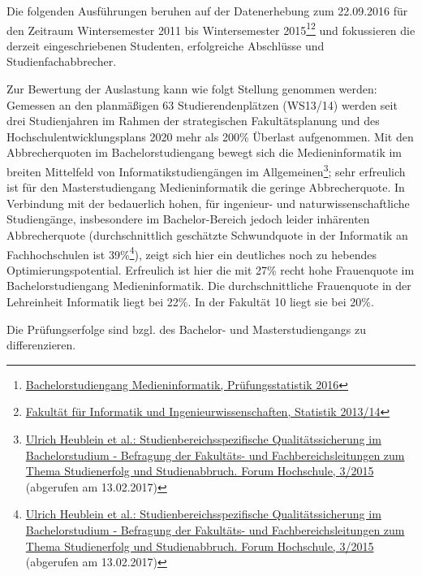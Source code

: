 Die folgenden Ausführungen beruhen auf der Datenerhebung zum 22.09.2016
für den Zeitraum Wintersemester 2011 bis Wintersemester 2015\footnote{\href{../anhaenge/pruefungsstatistiken.pdf}{Bachelorstudiengang
  Medieninformatik, Prüfungsstatistik 2016}}\footnote{\href{../anhaenge/Fakultaetsstruktur-Studienangebot-Personal-Haushaltsmittel-Kennzahlen-2014.pdf}{Fakultät
  für Informatik und Ingenieurwissenschaften, Statistik 2013/14}} und
fokussieren die derzeit eingeschriebenen Studenten, erfolgreiche
Abschlüsse und Studienfachabbrecher.

Zur Bewertung der Auslastung kann wie folgt Stellung genommen werden:
Gemessen an den planmäßigen 63 Studierendenplätzen (WS13/14) werden seit
drei Studienjahren im Rahmen der strategischen Fakultätsplanung und des
Hochschulentwicklungsplans 2020 mehr als 200\% Überlast aufgenommen. Mit
den Abbrecherquoten im Bachelorstudiengang bewegt sich die
Medieninformatik im breiten Mittelfeld von Informatikstudiengängen im
Allgemeinen\footnote{\href{http://www.dzhw.eu/pdf/pub_fh/fh-201503.pdf}{Ulrich
  Heublein et al.: Studienbereichsspezifische Qualitätssicherung im
  Bachelorstudium - Befragung der Fakultäts- und Fachbereichsleitungen
  zum Thema Studienerfolg und Studienabbruch. Forum Hochschule, 3/2015}
  (abgerufen am 13.02.2017)}; sehr erfreulich ist für den
Masterstudiengang Medieninformatik die geringe Abbrecherquote. In
Verbindung mit der bedauerlich hohen, für ingenieur- und
naturwissenschaftliche Studiengänge, insbesondere im Bachelor-Bereich
jedoch leider inhärenten Abbrecherquote (durchschnittlich geschätzte
Schwundquote in der Informatik an Fachhochschulen ist 39\%\footnote{\href{http://www.dzhw.eu/pdf/pub_fh/fh-201503.pdf}{Ulrich
  Heublein et al.: Studienbereichsspezifische Qualitätssicherung im
  Bachelorstudium - Befragung der Fakultäts- und Fachbereichsleitungen
  zum Thema Studienerfolg und Studienabbruch. Forum Hochschule, 3/2015}
  (abgerufen am 13.02.2017)}), zeigt sich hier ein deutliches noch zu
hebendes Optimierungspotential. Erfreulich ist hier die mit 27\% recht
hohe Frauenquote im Bachelorstudiengang Medieninformatik. Die
durchschnittliche Frauenquote in der Lehreinheit Informatik liegt bei
22\%. In der Fakultät 10 liegt sie bei 20\%.

Die Prüfungserfolge sind bzgl. des Bachelor- und Masterstudiengangs zu
differenzieren.

